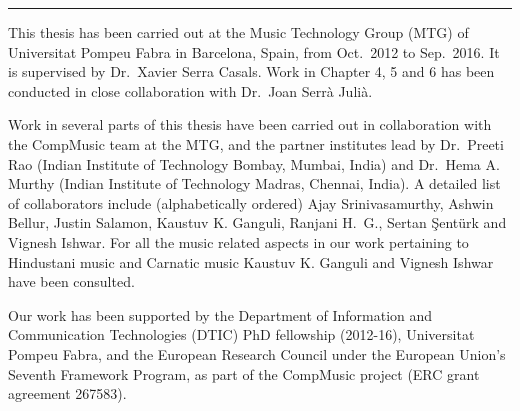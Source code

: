 
\vspace*{\fill}


\begin{center}
	\rule{0.3\textwidth}{.4pt}
\end{center}

This thesis has been carried out at the Music Technology Group (MTG) of Universitat Pompeu Fabra in Barcelona, Spain, from Oct.~2012 to Sep.~2016.
It is supervised by Dr.~Xavier Serra Casals. Work in Chapter 4, 5 and 6 has been conducted in close collaboration with Dr.~Joan Serrà Julià. 

Work in several parts of this thesis have been carried out in collaboration with the CompMusic team at the MTG, and the partner institutes lead by Dr.~Preeti Rao (Indian Institute of Technology Bombay, Mumbai, India) and Dr.~Hema A. Murthy (Indian Institute of Technology Madras, Chennai, India). A detailed list of collaborators include (alphabetically ordered) Ajay Srinivasamurthy, Ashwin Bellur, Justin Salamon, Kaustuv K. Ganguli, Ranjani H.~G., Sertan Şentürk and Vignesh Ishwar. For all the music related aspects in our work pertaining to Hindustani music and Carnatic music Kaustuv K. Ganguli and Vignesh Ishwar have been consulted. 

Our work has been supported by the Department of Information and Communication Technologies (DTIC) PhD fellowship (2012-16), Universitat Pompeu Fabra, and the European Research Council under the European Union’s Seventh Framework Program, as part of the CompMusic project (ERC grant agreement 267583).
